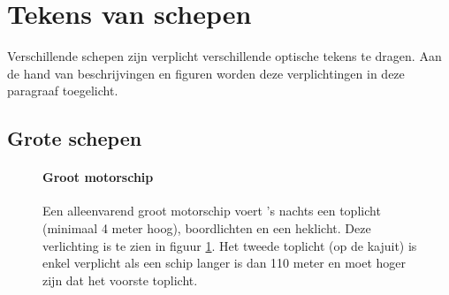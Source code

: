 \vfil\newpage
\section{Tekens van schepen}
Verschillende schepen zijn verplicht verschillende optische tekens te dragen. Aan de hand van beschrijvingen en figuren worden deze verplichtingen in deze paragraaf toegelicht. 
\subsection{Grote schepen}
\begin{figure}[H]
	\centering
	\begin{minipage}[t]{0.75\textwidth}
	\paragraph{Groot motorschip}
	Een alleenvarend groot motorschip voert 's nachts een toplicht (minimaal 4 meter hoog), boordlichten en een heklicht. Deze verlichting is te zien in figuur \ref{pic:optisch:grootmotor}. Het tweede toplicht (op de kajuit) is enkel verplicht als een schip langer is dan 110 meter en moet hoger zijn dat het voorste toplicht.
	\end{minipage}
	\hfill
	\begin{minipage}[t]{0.22\textwidth}
	\RemoveLine
	\caption{}
	\label{pic:optisch:grootmotor}
\end{minipage}
\end{figure}

